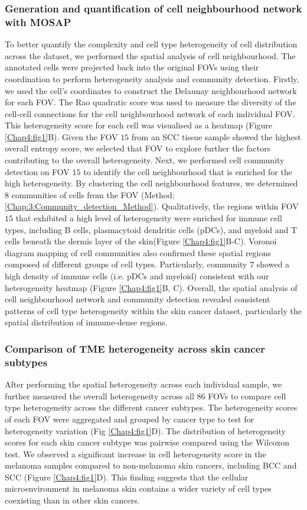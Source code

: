 \subsubsection{Generation and quantification of cell neighbourhood network with MOSAP}
To better quantify the complexity and cell type heterogeneity of cell distribution across the dataset, we performed the spatial analysis of cell neighbourhood. The annotated cells were projected back into the original FOVs using their coordination to perform heterogeneity analysis and community detection. Firstly, we used the cell's coordinates to construct the Delaunay neighbourhood network for each FOV. The Rao quadratic score was used to measure the diversity of the cell-cell connections for the cell neighbourhood network of each individual FOV.  This heterogeneity score for each cell was visualised as a heatmap (Figure \ref{Chap4:fig1}B). Given the FOV $15$ from an SCC tissue sample showed the highest overall entropy score, we selected that FOV to explore further the factors contributing to the overall heterogeneity. Next, we performed cell community detection on FOV $15$ to identify the cell neighbourhood that is enriched for the high heterogeneity. By clustering the cell neighbourhood features, we determined $8$ communities of cells from the FOV (Method: \ref{Chap:3:Community_detection_Method}). Qualitatively, the regions within FOV $15$ that exhibited a high level of heterogeneity were enriched for immune cell types, including B cells, plasmacytoid dendritic cells (pDCs), and myeloid and T cells beneath the dermis layer of the skin(Figure \ref{Chap4:fig1}B-C). Voronoi diagram mapping of cell communities also confirmed these spatial regions composed of different groups of cell types. Particularly, community $7$ showed a high density of immune cells (i.e. pDCs and myeloid) consistent with our heterogeneity heatmap (Figure \ref{Chap4:fig1}B, C). Overall, the spatial analysis of cell neighbourhood network and community detection revealed consistent patterns of cell type heterogeneity within the skin cancer dataset, particularly the spatial distribution of immune-dense regions.

\subsubsection{Comparison of TME heterogeneity across skin cancer subtypes}
After performing the spatial heterogeneity across each individual sample, we further measured the overall heterogeneity across all $86$ FOVs to compare cell type heterogeneity across the different cancer subtypes. The heterogeneity scores of each FOV were aggregated and grouped by cancer type to test for heterogeneity variation (Fig \ref{Chap4:fig1}D). The distribution of heterogeneity scores for each skin cancer subtype was pairwise compared using the Wilcoxon test. We observed a significant increase in cell heterogeneity score in the melanoma samples compared to non-melanoma skin cancers, including BCC and SCC (Figure \ref{Chap4:fig1}D). This finding suggests that the cellular microenvironment in melanoma skin contains a wider variety of cell types coexisting than in other skin cancers. 

